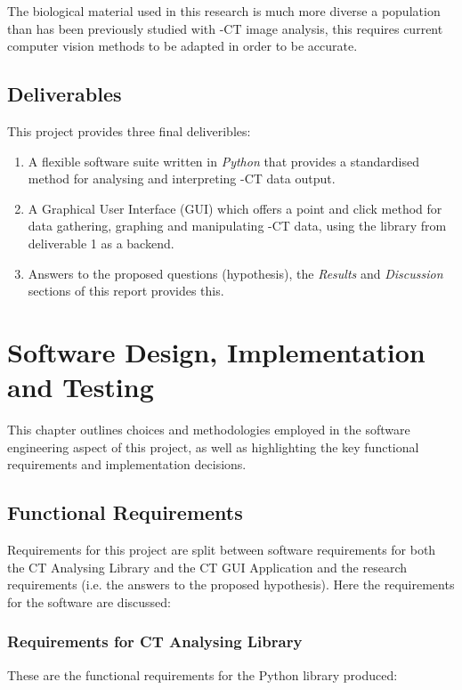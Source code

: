 \documentclass[11pt]{report}
\begin{document}
The biological material used in this research is much more diverse a population than has been previously studied with \textmu{}-CT image analysis, this requires current computer vision methods to be adapted in order to be accurate.

\section{Deliverables}
\label{sec:org8d6e4cc}

This project provides three final deliveribles:

\begin{enumerate}
\item A flexible software suite written in \emph{Python} that provides a standardised method for analysing and interpreting \textmu{}-CT data output.
\item A Graphical User Interface (GUI) which offers a point and click method for data gathering, graphing and manipulating \textmu{}-CT data, using the library from deliverable 1 as a backend.
\item Answers to the proposed questions (hypothesis), the \emph{Results} and \emph{Discussion} sections of this report provides this.
\end{enumerate}

\chapter{Software Design, Implementation and Testing}
\label{sec:orgac251ca}
This chapter outlines choices and methodologies employed in the software engineering aspect of this project, as well as highlighting the key functional requirements and implementation decisions.

\section{Functional Requirements}
\label{sec:org197070f}
Requirements for this project are split between software requirements for both the CT Analysing Library and the CT GUI Application and the research requirements (i.e. the answers to the proposed hypothesis). Here the requirements for the software are discussed:
\subsection{Requirements for CT Analysing Library}
\label{sec:orgbe817a4}

These are the functional requirements for the Python library produced:
\end{document}
